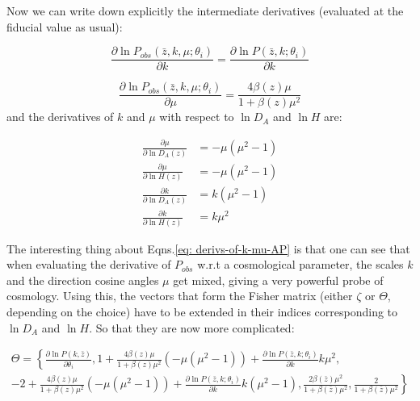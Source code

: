 Now we can write down explicitly the intermediate derivatives (evaluated
at the fiducial value as usual):

\begin{equation}
\frac{\partial\ln P_{obs}\left(\bar{z},k,\mu;\theta_{i}\right)}{\partial k}=\frac{\partial\ln P\left(\bar{z},k;\theta_{i}\right)}{\partial k}
\end{equation}


\begin{equation}
\frac{\partial\ln P_{obs}\left(\bar{z},k,\mu;\theta_{i}\right)}{\partial\mu}=\frac{4\beta(z)\mu}{1+\beta(z)\mu^{2}}
\end{equation}
and the derivatives of $k$ and $\mu$ with respect to $\ln D_{A}$
and $\ln H$ are:

\begin{subequations}
	
	\begin{align}
	\frac{\partial\mu}{\partial\ln D_{A}(z)} & =-\mu(\mu^{2}-1)\\
	\frac{\partial\mu}{\partial\ln H(z)} & =-\mu(\mu^{2}-1)\\
	\frac{\partial k}{\partial\ln D_{A}(z)} & =k(\mu^{2}-1)\\
	\frac{\partial k}{\partial\ln H(z)} & =k\mu^{2}
	\end{align}
	
	
	\label{eq: derivs-of-k-mu-AP}\end{subequations}

The interesting thing about Eqns.\ref{eq: derivs-of-k-mu-AP} is that
one can see that when evaluating the derivative of $P_{obs}$ w.r.t
a cosmological parameter, the scales $k$ and the direction cosine
angles $\mu$ get mixed, giving a very powerful probe of cosmology.
Using this, the vectors that form the Fisher matrix (either $\zeta$
or $\Theta$, depending on the choice) have to be extended in their
indices corresponding to $\ln D_{A}$ and $\ln H$. So that they are
now more complicated:

\begin{multline}
\Theta=\left\{ \frac{\partial\ln P(k,\bar{z})}{\partial\theta_{i}},1+\frac{4\beta(z)\mu}{1+\beta(z)\mu^{2}}(-\mu(\mu^{2}-1))+\frac{\partial\ln P\left(\bar{z},k;\theta_{i}\right)}{\partial k}k\mu^{2},\right.\\
\left.-2+\frac{4\beta(z)\mu}{1+\beta(z)\mu^{2}}(-\mu(\mu^{2}-1))+\frac{\partial\ln P\left(\bar{z},k;\theta_{i}\right)}{\partial k}k(\mu^{2}-1),\frac{2\beta(\bar{z})\mu^{2}}{1+\beta(\bar{z})\mu^{2}},\frac{2}{1+\beta(\bar{z})\mu^{2}}\right\} 
\end{multline}


